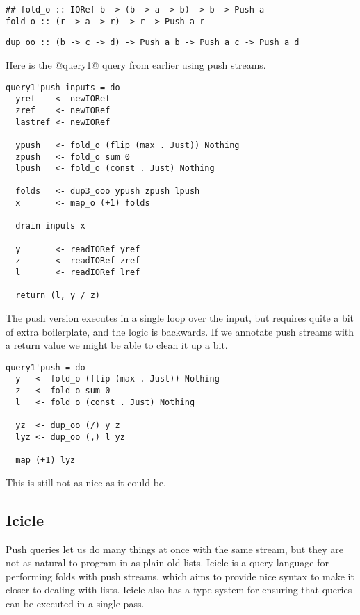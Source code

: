 \begin{lstlisting}
## fold_o :: IORef b -> (b -> a -> b) -> b -> Push a
fold_o :: (r -> a -> r) -> r -> Push a r
\end{lstlisting}

\begin{lstlisting}
dup_oo :: (b -> c -> d) -> Push a b -> Push a c -> Push a d
\end{lstlisting}

Here is the @query1@ query from earlier using push streams.

\begin{lstlisting}
query1'push inputs = do
  yref    <- newIORef
  zref    <- newIORef
  lastref <- newIORef

  ypush   <- fold_o (flip (max . Just)) Nothing
  zpush   <- fold_o sum 0
  lpush   <- fold_o (const . Just) Nothing

  folds   <- dup3_ooo ypush zpush lpush
  x       <- map_o (+1) folds

  drain inputs x

  y       <- readIORef yref
  z       <- readIORef zref
  l       <- readIORef lref

  return (l, y / z)
\end{lstlisting}

The push version executes in a single loop over the input, but requires quite a bit of extra boilerplate, and the logic is backwards.
If we annotate push streams with a return value we might be able to clean it up a bit.

\begin{lstlisting}
query1'push = do
  y   <- fold_o (flip (max . Just)) Nothing
  z   <- fold_o sum 0
  l   <- fold_o (const . Just) Nothing

  yz  <- dup_oo (/) y z
  lyz <- dup_oo (,) l yz

  map (+1) lyz
\end{lstlisting}


This is still not as nice as it could be.

\subsection{Icicle}

Push queries let us do many things at once with the same stream, but they are not as natural to program in as plain old lists.
Icicle is a query language for performing folds with push streams, which aims to provide nice syntax to make it closer to dealing with lists.
Icicle also has a type-system for ensuring that queries can be executed in a single pass.

